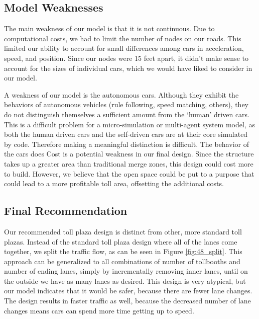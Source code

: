 \documentclass[a4paper, 11pt]{article}
\begin{document}
\subsection{Model Weaknesses}
The main weakness of our model is that it is not continuous.  Due to computational costs, we had to limit the number of nodes on our roads. This limited our ability to account for small differences among cars in acceleration, speed, and position. Since our nodes were 15 feet apart, it didn't make sense to account for the sizes of individual cars, which we would have liked to consider in our model. 

%
%
%
%
%
%


A weakness of our model is the autonomous cars. Although they exhibit the behaviors of autonomous vehicles (rule following, speed matching, others), they do not distinguish themselves a sufficient amount from the `human' driven cars. This is a difficult problem for a micro-simulation or multi-agent system model, as both the human driven cars and the self-driven cars are at their core simulated by code. Therefore making a meaningful distinction is difficult. The behavior of the cars does 
%
%
%
%
%
Cost is a potential weakness in our final design. Since the structure takes up a greater area than traditional merge zones, this design could cost more to build. However, we believe that the open space could be put to a purpose that could lead to a more profitable toll area, offsetting the additional costs. 


\subsection{Final Recommendation}
\label{final_rec}

Our recommended toll plaza design is distinct from other, more standard toll plazas. Instead of the standard toll plaza design where all of the lanes come together, we split the traffic flow, as can be seen in Figure \ref{fig:48_split}. This approach can be generalized to all combinations of number of tollbooths and number of ending lanes, simply by incrementally removing inner lanes, until on the outside we have as many lanes as desired. This design is very atypical, but our model indicates that it would be safer, because there are fewer lane changes. The design results in faster traffic as well, because the decreased number of lane changes means cars can spend more time getting up to speed. 
\end{document}
